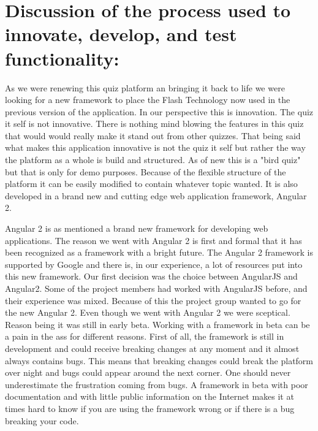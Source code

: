 \section { Discussion of the process used to innovate, develop, and test functionality:}
As we were renewing this quiz platform an bringing it back to life we were looking for a new framework to place the Flash Technology now used in the previous version of the application. In our perspective this is innovation. The quiz it self is not innovative. There is nothing mind blowing the features in this quiz that would would really make it stand out from other quizzes. That being said what makes this application innovative is not the quiz it self but rather the way the platform as a whole is build and structured. As of new this is a "bird quiz" but that is only for demo purposes. Because of the flexible structure of the platform it can be easily modified to contain whatever topic wanted. It is also developed in a brand new and cutting edge web application framework, Angular 2\cite{Angular2:online}.

\par
Angular 2 is as mentioned a brand new framework for developing web applications. The reason we went with Angular 2 is first and formal that it has been recognized as a framework with a bright future. The Angular 2 framework is supported by Google and there is, in our experience, a lot of resources put into this new framework. Our first decision was the choice between AngularJS\cite{Angul93:online} and Angular2. Some of the project members had worked with AngularJS before, and their experience was mixed. Because of this the project group wanted to go for the new Angular 2. Even though we went with Angular 2 we were sceptical. Reason being it was still in early beta. Working with a framework in beta can be a pain in the ass for different reasons. First of all, the framework is still in development and could receive breaking changes at any moment and it almost always contains bugs. This means that breaking changes could break the platform over night and bugs could appear around the next corner. One should never underestimate the frustration coming from bugs. A framework in beta with poor documentation and with little public information on the Internet makes it at times hard to know if you are using the framework wrong or if there is a bug breaking your code.  

\par




